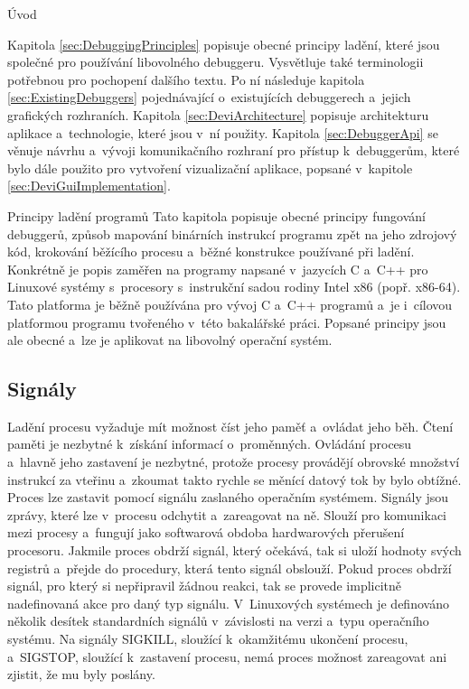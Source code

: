 \documentclass[czech,bachelor,male,python,dept460,hidelinks]{diploma}						%
\newcommand{\parspace}[1][]{
	\ifthenelse{\isempty{#1}}{\vspace{0mm}}{\vspace{#1}}
	\par
}
\begin{document}
\begin{section}{Úvod}
	\parspace Kapitola \ref{sec:DebuggingPrinciples} popisuje obecné principy ladění, které jsou společné pro používání libovolného debuggeru.
	Vysvětluje také terminologii potřebnou pro pochopení dalšího textu. Po ní následuje kapitola \ref{sec:ExistingDebuggers} pojednávající o~existujících
	debuggerech a~jejich grafických rozhraních. Kapitola \ref{sec:DeviArchitecture} popisuje architekturu aplikace a~technologie, které jsou v~ní použity.
	Kapitola \ref{sec:DebuggerApi} se věnuje návrhu a~vývoji komunikačního rozhraní pro přístup k~debuggerům, které bylo dále použito pro vytvoření
	vizualizační aplikace, popsané v~kapitole \ref{sec:DeviGuiImplementation}.
\end{section}
\begin{section}{Principy ladění programů}
\label{sec:DebuggingPrinciples}
	Tato kapitola popisuje obecné principy fungování debuggerů, způsob mapování binárních instrukcí programu zpět na jeho zdrojový kód,
	krokování běžícího procesu a~běžné konstrukce používané při ladění. Konkrétně je popis zaměřen na programy napsané v~jazycích C a~C++
	pro Linuxové systémy s~procesory s~instrukční sadou rodiny Intel x86 (popř. x86-64).
	Tato platforma je běžně používána pro vývoj C a~C++ programů a~je i~cílovou platformou programu tvořeného v~této bakalářské práci.
	Popsané principy jsou ale obecné a~lze je aplikovat na libovolný operační systém.
		
	\subsection{Signály}
		Ladění procesu vyžaduje mít možnost číst jeho paměť a~ovládat jeho běh. Čtení paměti je nezbytné k~získání informací o~proměnných.
		Ovládání procesu a~hlavně jeho zastavení je nezbytné, protože procesy provádějí obrovské množství instrukcí za vteřinu
		a~zkoumat takto rychle se měnící datový tok by bylo obtížné. Proces lze zastavit pomocí signálu zaslaného operačním systémem.
		Signály jsou zprávy, které lze v~procesu odchytit a~zareagovat na ně. \cite[21]{tanenbaum}
		Slouží pro komunikaci mezi procesy a~fungují jako softwarová obdoba hardwarových přerušení procesoru.
		Jakmile proces obdrží signál, který očekává, tak si uloží hodnoty svých registrů a~přejde do procedury, která tento signál obslouží.
		Pokud proces obdrží signál, pro který si nepřipravil žádnou reakci, tak se provede implicitně nadefinovaná akce pro daný typ signálu.
		V~Linuxových systémech je definováno několik desítek standardních signálů v~závislosti na verzi a~typu operačního systému.
		Na signály SIGKILL, sloužící k~okamžitému ukončení procesu, a~SIGSTOP, sloužící k~zastavení procesu, nemá proces možnost zareagovat ani
		zjistit, že mu byly poslány.
	

\end{section}
\end{document}
